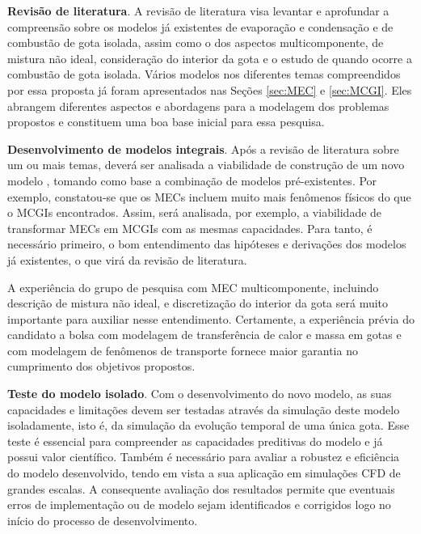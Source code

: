 \textbf{Revisão de literatura}. 
A revisão de literatura visa levantar e aprofundar a compreensão sobre os modelos já  existentes de evaporação e condensação e de combustão de gota isolada, assim como o dos aspectos multicomponente, de mistura não ideal, consideração do interior da gota e o estudo de quando ocorre a combustão de gota isolada.
Vários modelos nos diferentes temas compreendidos por essa proposta já foram apresentados nas Seções \ref{sec:MEC} e \ref{sec:MCGI}.
Eles abrangem diferentes aspectos e abordagens para a modelagem dos problemas propostos e constituem uma boa base inicial para essa pesquisa. 

\textbf{Desenvolvimento de modelos integrais}.
Após a revisão de literatura sobre um ou mais temas, deverá ser analisada a viabilidade de construção de um novo modelo , tomando como base a combinação de modelos  pré-existentes.
Por exemplo, constatou-se que os MECs incluem muito mais fenômenos físicos do que o MCGIs encontrados. 
Assim, será analisada, por exemplo, a viabilidade de transformar MECs em MCGIs com as mesmas capacidades.
Para tanto, é necessário primeiro, o bom entendimento das hipóteses e derivações dos modelos já existentes, o que virá da revisão de literatura.   

A experiência do grupo de pesquisa com MEC multicomponente, incluindo descrição de mistura não ideal, e discretização do interior da gota será muito importante para auxiliar nesse entendimento.
Certamente, a experiência prévia do candidato a bolsa com modelagem de transferência de calor e massa em gotas \cite{HenningsJ2024MT} e com modelagem de fenômenos de transporte \cite{HenningsJ2023BT,DokozaT2024,DokozaT2025,DeBroeckL2025} fornece maior garantia no cumprimento dos objetivos propostos. %

\textbf{Teste do modelo isolado}.
Com o desenvolvimento do novo modelo, as suas capacidades e limitações devem ser testadas através da simulação deste modelo isoladamente, isto é, da simulação da evolução temporal de uma única gota.
Esse teste é essencial para compreender as capacidades preditivas do modelo e já possui valor científico. Também é necessário para avaliar a robustez e eficiência do modelo desenvolvido, tendo em vista a sua aplicação em simulações CFD de grandes escalas.
A consequente avaliação dos resultados permite que eventuais erros de implementação ou de modelo sejam identificados e corrigidos logo no início do processo de desenvolvimento.

